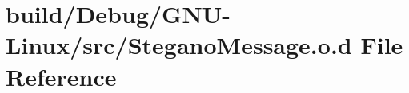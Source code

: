 \hypertarget{SteganoMessage_8o_8d}{}\section{build/\+Debug/\+G\+N\+U-\/\+Linux/src/\+Stegano\+Message.o.\+d File Reference}
\label{SteganoMessage_8o_8d}
